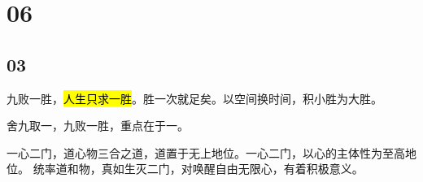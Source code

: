 \section{06}

\subsection{03}

九败一胜，\hl{人生只求一胜}。胜一次就足矣。以空间换时间，积小胜为大胜。

舍九取一，九败一胜，重点在于一。

一心二门，道心物三合之道，道置于无上地位。一心二门，以心的主体性为至高地位。
统率道和物，真如生灭二门，对唤醒自由无限心，有着积极意义。
